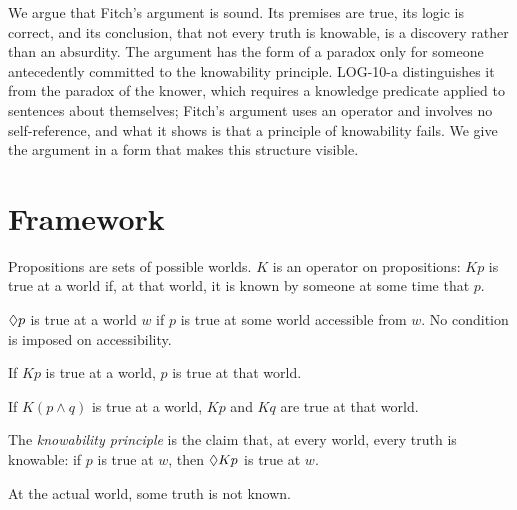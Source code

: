\documentclass{situationist-preprint}
\begin{document}
We argue that Fitch's argument is sound. Its premises are true, its logic is correct, and its conclusion, that not every truth is knowable, is a discovery rather than an absurdity. The argument has the form of a paradox only for someone antecedently committed to the knowability principle. LOG-10-a distinguishes it from the paradox of the knower, which requires a knowledge predicate applied to sentences about themselves; Fitch's argument uses an operator and involves no self-reference, and what it shows is that a principle of knowability fails. We give the argument in a form that makes this structure visible.

\section{Framework}

\begin{definition}\label{d:K}
Propositions are sets of possible worlds. $K$ is an operator on propositions: $Kp$ is true at a world if, at that world, it is known by someone at some time that $p$.
\end{definition}

\begin{definition}\label{d:pos}
$\mathord{\Diamond} p$ is true at a world $w$ if $p$ is true at some world accessible from $w$. No condition is imposed on accessibility.
\end{definition}

\begin{assumption}[Factivity]\label{a:fact}
If $Kp$ is true at a world, $p$ is true at that world.
\end{assumption}

\begin{assumption}[Distribution]\label{a:dist}
If $K(p \wedge q)$ is true at a world, $Kp$ and $Kq$ are true at that world.
\end{assumption}

\begin{definition}\label{d:kp}
The \emph{knowability principle} is the claim that, at every world, every truth is knowable: if $p$ is true at $w$, then $\mathord{\Diamond} Kp$ is true at $w$.
\end{definition}

\begin{assumption}\label{a:nonomni}
At the actual world, some truth is not known.
\end{assumption}
\end{document}

